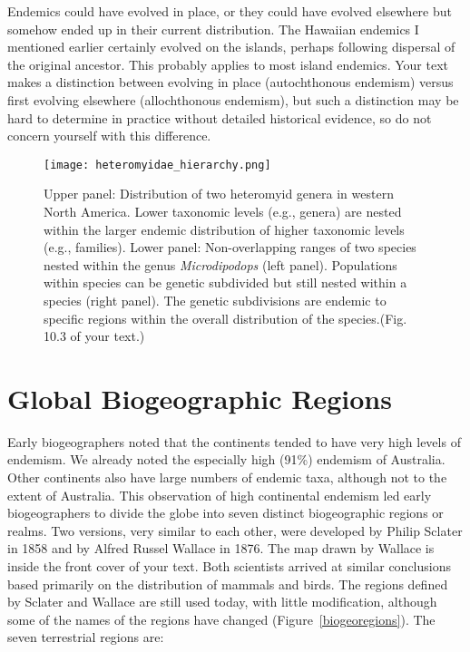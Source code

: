 \documentclass[11pt, hidelinks]{article}
\begin{document}
Endemics could have evolved in place, or they could have evolved elsewhere but somehow ended up in their current distribution.  The Hawaiian endemics I mentioned earlier certainly evolved on the islands, perhaps following dispersal of the original ancestor.  This probably applies to most island endemics.  Your text makes a distinction between evolving in place (autochthonous endemism) versus first evolving elsewhere (allochthonous endemism), but such a distinction may be hard to determine in practice without detailed historical evidence, so do not concern yourself with this difference.

\begin{figure}[tbp]
	\centering
		\texttt{[image: heteromyidae\_hierarchy.png]}
		\caption{Upper panel: Distribution of two heteromyid genera in western North America. Lower taxonomic levels (e.g., genera) are nested within the larger endemic distribution of higher taxonomic levels (e.g., families). Lower panel: Non-overlapping ranges of two species nested within the genus \emph{Microdipodops} (left panel). Populations within species can be genetic subdivided but still nested within a species (right panel). The genetic subdivisions are endemic to specific regions within the overall distribution of the species.(Fig. 10.3 of your text.)\label{heteroEndemism}}
		
\end{figure}


\section{Global Biogeographic Regions}

Early biogeographers noted that the continents tended to have very high levels of endemism.  We already noted the especially high (91\%) endemism of Australia.  Other continents also have large numbers of endemic taxa, although not to the extent of Australia.  This observation of high continental endemism led early biogeographers to divide the globe into seven distinct biogeographic regions or realms.  Two versions, very similar to each other, were developed by Philip Sclater in 1858 and by Alfred Russel Wallace in 1876. The map drawn by Wallace is inside the front cover of your text. Both scientists arrived at similar conclusions based primarily on the distribution of mammals and birds. The regions defined by Sclater and Wallace are still used today, with little modification, although some of the names of the regions have changed (Figure~\ref{biogeoregions}).  The seven terrestrial regions are: 
\end{document}
